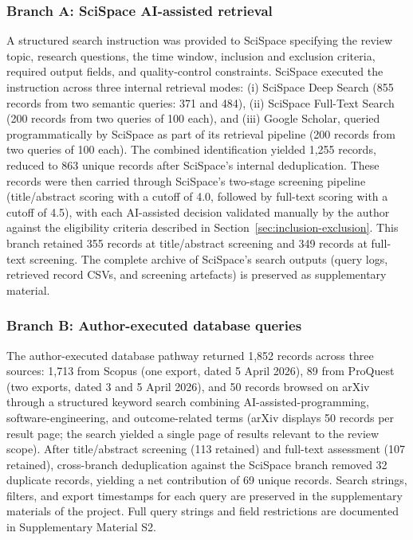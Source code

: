 \subsubsection{Branch A: SciSpace AI-assisted retrieval}
\label{sec:branch-a}
A structured search instruction was provided to SciSpace specifying the review topic, research questions, the time window, inclusion and exclusion criteria, required output fields, and quality-control constraints. SciSpace executed the instruction across three internal retrieval modes: (i) SciSpace Deep Search (855 records from two semantic queries: 371 and 484), (ii) SciSpace Full-Text Search (200 records from two queries of 100 each), and (iii) Google Scholar, queried programmatically by SciSpace as part of its retrieval pipeline (200 records from two queries of 100 each). The combined identification yielded 1,255 records, reduced to 863 unique records after SciSpace's internal deduplication. These records were then carried through SciSpace's two-stage screening pipeline (title/abstract scoring with a cutoff of 4.0, followed by full-text scoring with a cutoff of 4.5), with each AI-assisted decision validated manually by the author against the eligibility criteria described in Section~\ref{sec:inclusion-exclusion}. This branch retained 355 records at title/abstract screening and 349 records at full-text screening. The complete archive of SciSpace's search outputs (query logs, retrieved record CSVs, and screening artefacts) is preserved as supplementary material.

\subsubsection{Branch B: Author-executed database queries}
\label{sec:branch-b}
The author-executed database pathway returned 1,852 records across three sources: 1,713 from Scopus (one export, dated 5 April 2026), 89 from ProQuest (two exports, dated 3 and 5 April 2026), and 50 records browsed on arXiv through a structured keyword search combining AI-assisted-programming, software-engineering, and outcome-related terms (arXiv displays 50 records per result page; the search yielded a single page of results relevant to the review scope). After title/abstract screening (113 retained) and full-text assessment (107 retained), cross-branch deduplication against the SciSpace branch removed 32 duplicate records, yielding a net contribution of 69 unique records. Search strings, filters, and export timestamps for each query are preserved in the supplementary materials of the project. Full query strings and field restrictions are documented in Supplementary Material S2.


